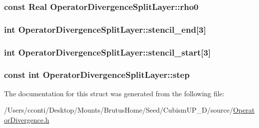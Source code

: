 \subsubsection[{rho0}]{\setlength{\rightskip}{0pt plus 5cm}const {\bf Real} Operator\+Divergence\+Split\+Layer\+::rho0}\label{struct_operator_divergence_split_layer_acb5c6d750885812f5d90eca819c596a4}
\hypertarget{struct_operator_divergence_split_layer_a206b9c02b36823ef678e80407fffd1b4}{}
\subsubsection[{stencil\+\_\+end}]{\setlength{\rightskip}{0pt plus 5cm}int Operator\+Divergence\+Split\+Layer\+::stencil\+\_\+end\mbox{[}3\mbox{]}}\label{struct_operator_divergence_split_layer_a206b9c02b36823ef678e80407fffd1b4}
\hypertarget{struct_operator_divergence_split_layer_a404346d4f53ec8d77d62657b75f8db30}{}
\subsubsection[{stencil\+\_\+start}]{\setlength{\rightskip}{0pt plus 5cm}int Operator\+Divergence\+Split\+Layer\+::stencil\+\_\+start\mbox{[}3\mbox{]}}\label{struct_operator_divergence_split_layer_a404346d4f53ec8d77d62657b75f8db30}
\hypertarget{struct_operator_divergence_split_layer_a40f9ce0dcd01080cc50c0ce22a4a3eb4}{}
\subsubsection[{step}]{\setlength{\rightskip}{0pt plus 5cm}const int Operator\+Divergence\+Split\+Layer\+::step}\label{struct_operator_divergence_split_layer_a40f9ce0dcd01080cc50c0ce22a4a3eb4}


The documentation for this struct was generated from the following file\+:\begin{DoxyCompactItemize}
\item 
/\+Users/cconti/\+Desktop/\+Mounts/\+Brutus\+Home/\+Seed/\+Cubism\+U\+P\+\_\+D/source/\hyperlink{_operator_divergence_8h}{Operator\+Divergence.\+h}\end{DoxyCompactItemize}
